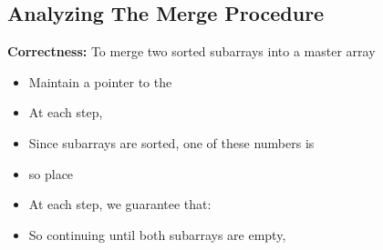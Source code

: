 \documentclass[11  pt]{article}
\begin{document}
\newpage

\subsection{Analyzing The Merge Procedure}

\vfill
\textbf{Correctness:} To merge two sorted subarrays into a master array
\begin{itemize}
	\setlength\itemsep{2em}
	\item  Maintain a pointer to the 
	\item  At each step, 
	\item Since subarrays are sorted, one of these numbers is  \\
	
	\item so place  
	\item At each step, we guarantee that:  \\
	
	\item So continuing until both subarrays are empty, 
\end{itemize}

	
	
\end{document}
